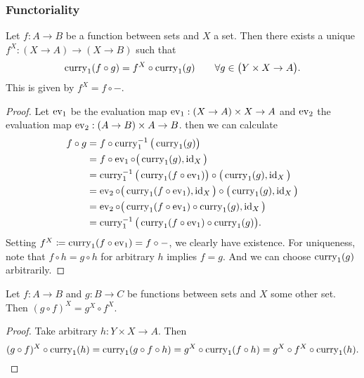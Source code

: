 \subsubsection{Functoriality}
\begin{proposition}
Let $f: A\to B$ be a function between sets and $X$ a set. Then there exists a unique $f^X: (X\to A)\to (X\to B)$ such that
\[ \operatorname{curry}_1(f\circ g) = f^X\circ \operatorname{curry}_1(g) \qquad \forall g\in \big(Y\times X \to A\big). \]
This is given by $f^X = f\circ -$.
\end{proposition}
\begin{proof}
Let $\operatorname{ev}_1$ be the evaluation map $\operatorname{ev}_1: (X\to A)\times X \to A$ and $\operatorname{ev}_2$ the evaluation map $\operatorname{ev}_2: (A\to B) \times A \to B$.
then we can calculate
\begin{align*}
f \circ g &= f \circ \operatorname{curry}_1^{-1}\big(\operatorname{curry}_1(g)\big) \\
&= f \circ \operatorname{ev}_1 \circ \big(\operatorname{curry}_1(g), \operatorname{id}_X\big) \\
&= \operatorname{curry}_1^{-1}\big(\operatorname{curry}_1(f \circ \operatorname{ev}_1)\big) \circ \big(\operatorname{curry}_1(g), \operatorname{id}_X\big) \\
&= \operatorname{ev}_2\circ \big(\operatorname{curry}_1(f \circ \operatorname{ev}_1), \operatorname{id}_X\big) \circ \big(\operatorname{curry}_1(g), \operatorname{id}_X\big) \\
&= \operatorname{ev}_2\circ \big(\operatorname{curry}_1(f \circ \operatorname{ev}_1) \circ \operatorname{curry}_1(g), \operatorname{id}_X\big) \\
&= \operatorname{curry}_1^{-1}\big(\operatorname{curry}_1(f \circ \operatorname{ev}_1) \circ \operatorname{curry}_1(g)\big).
\end{align*}
Setting $f^X \coloneqq \operatorname{curry}_1(f \circ \operatorname{ev}_1) = f\circ -$, we clearly have existence. For uniqueness, note that $f\circ h = g \circ h$ for arbitrary $h$ implies $f=g$. And we can choose $\operatorname{curry}_1(g)$ arbitrarily.
\end{proof}
\begin{corollary}
Let $f: A\to B$ and $g: B\to C$ be functions between sets and $X$ some other set. Then $(g\circ f)^X = g^X\circ f^X$.
\end{corollary}
\begin{proof}
Take arbitrary $h: Y\times X \to A$. Then
\[ (g\circ f)^X\circ \operatorname{curry}_1(h) = \operatorname{curry}_1(g\circ f\circ h) = g^X\circ \operatorname{curry}_1(f\circ h) = g^X \circ f^X \circ \operatorname{curry}_1(h). \]
\end{proof}

